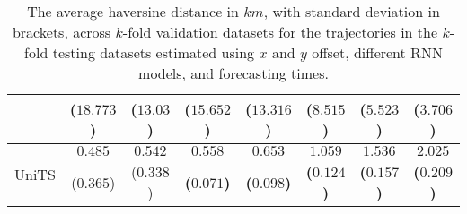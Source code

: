 \begin{table}[!ht]
{\begin{tabular}{|c|c|c|c|c|c|c|c|}
			 & ($18.773$) & ($13.03$) & ($15.652$) & ($13.316$) & ($8.515$) & ($5.523$) & ($3.706$) \\ \hline
			\multirow{2}{*}{UniTS} & $0.485$ & $0.542$ & $\mathbf{0.558}$ & $\mathbf{0.653}$ & $\mathbf{1.059}$ & $\mathbf{1.536}$ & $\mathbf{2.025}$ \\
			 & ($0.365$) & ($0.338$) & \textbf{(}$\mathbf{0.071}$\textbf{)} & \textbf{(}$\mathbf{0.098}$\textbf{)} & \textbf{(}$\mathbf{0.124}$\textbf{)} & \textbf{(}$\mathbf{0.157}$\textbf{)} & \textbf{(}$\mathbf{0.209}$\textbf{)} \\ \hline
		\end{tabular}
	}
	\caption{The average haversine distance in $km$, with standard deviation in brackets, across $k$-fold validation datasets for the trajectories in the $k$-fold testing datasets estimated using $x$ and $y$ offset, different RNN models, and forecasting times.}
	\label{tab:all_no_abs_haversine}
\end{table}